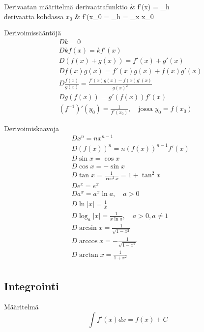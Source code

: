 \begin{eqtable-full}{Derivaatan määritelmä \cite[s. 41]{MAOL} }
derivaattafunktio			& f'(x) = \lim_{h }  \\
derivaatta kohdassa $x_0$	& f'(x_0 = \lim_{h }  = \lim_{x \rightarrow x_0}  \\
\end{eqtable-full}

Derivoimissääntöjä \cite[s. 41]{MAOL}
\begin{align*}
& Dk					= 0 \\
& Dkf(x)				= kf'(x) \\
& D(f(x) + g(x))		= f'(x) + g'(x) \\
& Df(x)g(x)			= f'(x)g(x)+f(x)g'(x) \\
& D \frac{f(x)}{g(x)}	= \frac{f'(x)g(x)-f(x)g'(x)}{g(x)^2} \\
& D g(f(x))			= g'(f(x))f'(x) \\
& (f^{-1})'(y_0)		= \frac{1}{f'(x_0)}, \quad \text{jossa } y_0 = f(x_0)
\end{align*}

Derivoimiskaavoja \cite[s. 41]{MAOL}
\begin{align*}
& Dx^n	= nx^{n-1} \\
& D(f(x))^n	= n(f(x))^{n-1} f'(x) \\
& D \sin x	= \cos x \\
& D \cos x	= -\sin x \\
& D \tan x	= \frac{1}{\cos^2 x} = 1 + \tan^2 x \\
& D e^x		= e^x \\
& D a^x		= a^x \ln a, \quad a>0 \\
& D \ln |x|	= \frac{1}{x} \\
& D \log_a |x|	= \frac{1}{x \ln a}, \quad a>0, a \neq 1 \\
& D \arcsin x	= \frac{1}{\sqrt{1-x^2}} \\
& D \arccos x	= - \frac{1}{\sqrt{1-x^2}} \\
& D \arctan x	= \frac{1}{1+x^2} \\
\end{align*}

\subsection{Integrointi}
Määritelmä \cite[(1.8)]{MAT-01360}
\begin{equation*}
\int f'(x) dx = f(x) + C
\end{equation*}


